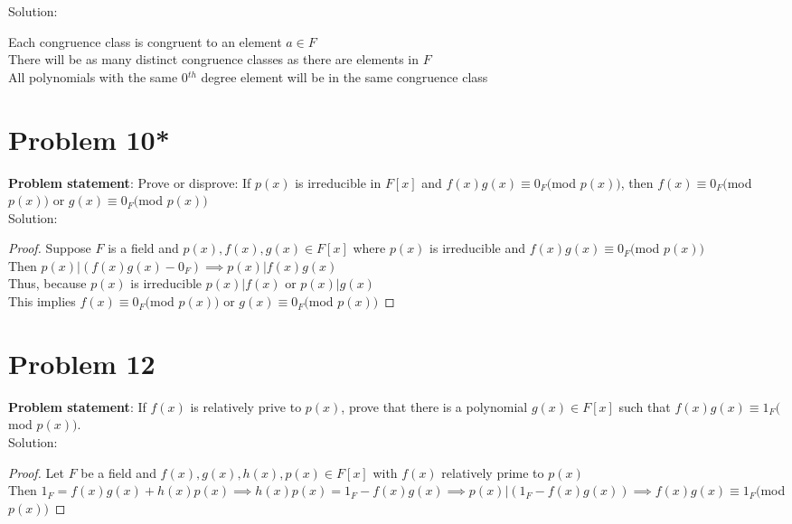 \documentclass{article} %
\begin{document}
Solution: 
\begin{addmargin}[1em]{0em}
Each congruence class is congruent to an element $a \in F$
\\There will be as many distinct congruence classes as there are elements in $F$
\\All polynomials with the same 0$^{th}$ degree element will be in the same congruence class
\end{addmargin}

\newpage

\section*{Problem 10*}


\textbf{Problem statement}: Prove or disprove: If $p(x)$ is irreducible in $F[x]$ and $f(x)g(x) \equiv 0_F($mod $p(x))$, then $f(x) \equiv 0_F($mod $p(x))$ or $g(x) \equiv 0_F($mod $p(x))$
\\

Solution: 
\begin{addmargin}[1em]{0em}
\begin{proof}
Suppose $F$ is a field and $p(x), f(x), g(x) \in F[x]$ where $p(x)$ is irreducible and $f(x)g(x) \equiv 0_F($mod $p(x))$
\\Then $p(x)|(f(x)g(x)-0_F) \implies p(x)|f(x)g(x)$
\\Thus, because $p(x)$ is irreducible $p(x)|f(x)$ or $p(x)|g(x)$
\\This implies $f(x) \equiv 0_F($mod $p(x))$ or $g(x) \equiv 0_F($mod $p(x))$
\end{proof}
\end{addmargin}

\newpage

\section*{Problem 12}


\textbf{Problem statement}: If $f(x)$ is relatively prive to $p(x)$, prove that there is a polynomial $g(x) \in F[x]$ such that $f(x)g(x) \equiv 1_F($mod $p(x))$.
\\

Solution: 
\begin{addmargin}[1em]{0em}
\begin{proof}
Let $F$ be a field and $f(x), g(x), h(x),p(x) \in F[x]$ with $f(x)$ relatively prime to $p(x)$
\\Then $1_F = f(x)g(x) + h(x)p(x) \implies h(x)p(x) = 1_F - f(x)g(x) \implies p(x)|(1_F - f(x)g(x)) \implies f(x)g(x) \equiv 1_F($mod $p(x))$
\end{proof}
\end{addmargin}

\end{document}
